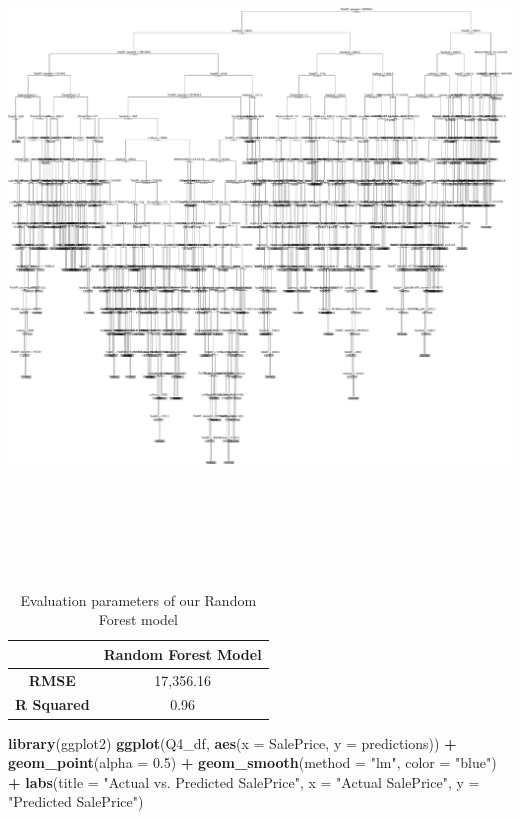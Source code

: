 \documentclass[
]{article}
\newenvironment{Shaded}{\begin{snugshade}}{\end{snugshade}}
\newcommand{\AttributeTok}[1]{\textcolor[rgb]{0.13,0.29,0.53}{#1}}
\newcommand{\FloatTok}[1]{\textcolor[rgb]{0.00,0.00,0.81}{#1}}
\newcommand{\FunctionTok}[1]{\textcolor[rgb]{0.13,0.29,0.53}{\textbf{#1}}}
\newcommand{\NormalTok}[1]{#1}
\newcommand{\SpecialCharTok}[1]{\textcolor[rgb]{0.81,0.36,0.00}{\textbf{#1}}}
\newcommand{\StringTok}[1]{\textcolor[rgb]{0.31,0.60,0.02}{#1}}
\begin{document}
\includegraphics[width=7in,height=7in]{STAT847_W24_Final_files/figure-latex/unnamed-chunk-17-1}

\begin{table}[!h]
\centering
\caption{Evaluation parameters of our Random Forest model}
\begin{tabular}{|c|c|}
\hline
& \textbf{Random Forest Model} \\
\hline
\textbf{RMSE} & 17,356.16 \\
\hline
\textbf{R Squared} & 0.96 \\
\hline
\end{tabular}
\end{table}

\begin{Shaded}
\begin{Highlighting}[]
\FunctionTok{library}\NormalTok{(ggplot2)}
\FunctionTok{ggplot}\NormalTok{(Q4\_df, }\FunctionTok{aes}\NormalTok{(}\AttributeTok{x =}\NormalTok{ SalePrice, }\AttributeTok{y =}\NormalTok{ predictions)) }\SpecialCharTok{+}
    \FunctionTok{geom\_point}\NormalTok{(}\AttributeTok{alpha =} \FloatTok{0.5}\NormalTok{) }\SpecialCharTok{+} \FunctionTok{geom\_smooth}\NormalTok{(}\AttributeTok{method =} \StringTok{"lm"}\NormalTok{,}
    \AttributeTok{color =} \StringTok{"blue"}\NormalTok{) }\SpecialCharTok{+} \FunctionTok{labs}\NormalTok{(}\AttributeTok{title =} \StringTok{"Actual vs. Predicted SalePrice"}\NormalTok{,}
    \AttributeTok{x =} \StringTok{"Actual SalePrice"}\NormalTok{, }\AttributeTok{y =} \StringTok{"Predicted SalePrice"}\NormalTok{)}
\end{Highlighting}
\end{Shaded}
\end{document}
